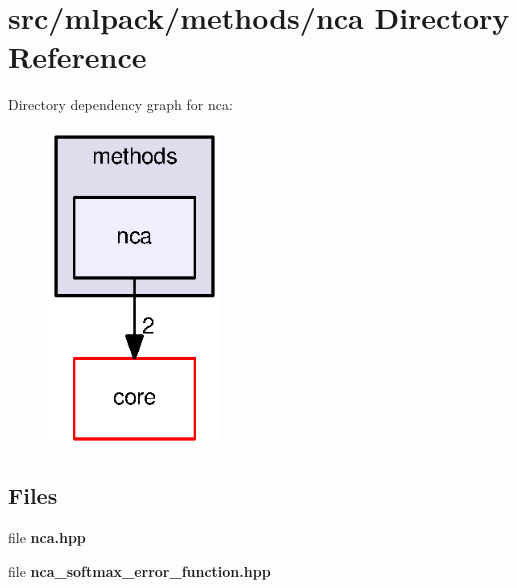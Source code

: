 \section{src/mlpack/methods/nca Directory Reference}
\label{dir_dcee21e1606ddff0b2f71b477ed9280c}
Directory dependency graph for nca\+:
\nopagebreak
\begin{figure}[H]
\begin{center}
\leavevmode
\includegraphics[width=130pt]{dir_dcee21e1606ddff0b2f71b477ed9280c_dep}
\end{center}
\end{figure}
\subsection*{Files}
\begin{DoxyCompactItemize}
\item 
file {\bf nca.\+hpp}
\item 
file {\bf nca\+\_\+softmax\+\_\+error\+\_\+function.\+hpp}
\end{DoxyCompactItemize}
